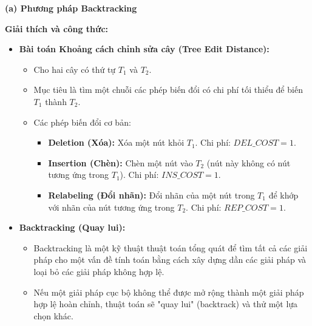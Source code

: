 \documentclass{article}
\begin{document}
\textbf{(a) Phương pháp Backtracking}

\textbf{Giải thích và công thức:}

\begin{itemize}
    \item \textbf{Bài toán Khoảng cách chỉnh sửa cây (Tree Edit Distance):}
    \begin{itemize}
        \item Cho hai cây có thứ tự $T_1$ và $T_2$.
        \item Mục tiêu là tìm một chuỗi các phép biến đổi có chi phí tối thiểu để biến $T_1$ thành $T_2$.
        \item Các phép biến đổi cơ bản:
            \begin{itemize}
                \item \textbf{Deletion (Xóa):} Xóa một nút khỏi $T_1$. Chi phí: $DEL\_COST = 1$.
                \item \textbf{Insertion (Chèn):} Chèn một nút vào $T_2$ (nút này không có nút tương ứng trong $T_1$). Chi phí: $INS\_COST = 1$.
                \item \textbf{Relabeling (Đổi nhãn):} Đổi nhãn của một nút trong $T_1$ để khớp với nhãn của nút tương ứng trong $T_2$. Chi phí: $REP\_COST = 1$.
            \end{itemize}
    \end{itemize}

    \item \textbf{Backtracking (Quay lui):}
    \begin{itemize}
        \item Backtracking là một kỹ thuật thuật toán tổng quát để tìm tất cả các giải pháp cho một vấn đề tính toán bằng cách xây dựng dần các giải pháp và loại bỏ các giải pháp không hợp lệ.
        \item Nếu một giải pháp cục bộ không thể được mở rộng thành một giải pháp hợp lệ hoàn chỉnh, thuật toán sẽ "quay lui" (backtrack) và thử một lựa chọn khác.
    \end{itemize}


\end{itemize}
\end{document}
